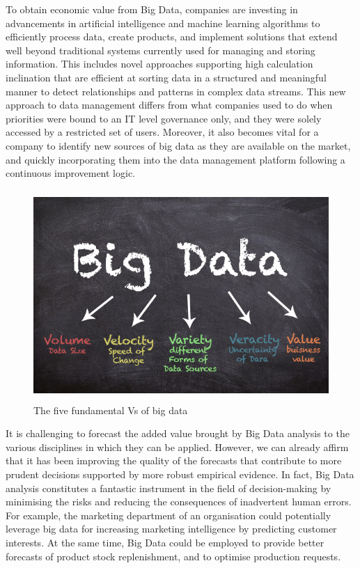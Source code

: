 To obtain economic value from Big Data, companies are investing in advancements in artificial intelligence and machine learning algorithms to efficiently process data, create products, and implement solutions that extend well beyond traditional systems currently used for managing and storing information. This includes novel approaches supporting high calculation inclination that are efficient at sorting data in a structured and meaningful manner to detect relationships and patterns in complex data streams. This new approach to data management differs from what companies used to do when priorities were bound to an IT level governance only, and they were solely accessed by a restricted set of users. Moreover, it also becomes vital for a company to identify new sources of big data as they are available on the market, and quickly incorporating them into the data management platform following a continuous improvement logic.

\vspace{0.5cm}
\begin{figure}[htbp]
  \centering
    \includegraphics[height=8cm]{images/bigdata.png}
  \caption{The five fundamental Vs of big data }
  \label{fig:bigdata}
\end{figure}
\vspace{0.5cm}
\newpage
It is challenging to forecast the added value brought by Big Data analysis to the various disciplines in which they can be applied. However, we can already affirm that it has been improving the quality of the forecasts that contribute to more prudent decisions supported by more robust empirical evidence. 
In fact, Big Data analysis constitutes a fantastic instrument in the field of decision-making by minimising the risks and reducing the consequences of inadvertent human errors. For example, the marketing department of an organisation could potentially leverage big data for increasing marketing intelligence by predicting customer interests. At the same time, Big Data could be employed to provide better forecasts of product stock replenishment, and to optimise production requests.

